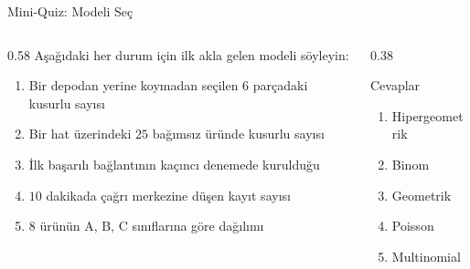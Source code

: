 \documentclass[light]{lutbeamer}
\begin{document}
\begin{frame}{Mini-Quiz: Modeli Seç}
    \scriptsize
    \begin{columns}[T,onlytextwidth]
        \begin{column}{0.58\textwidth}
            Aşağıdaki her durum için ilk akla gelen modeli söyleyin:
            \begin{enumerate}
                \item Bir depodan yerine koymadan seçilen \(6\) parçadaki kusurlu sayısı
                \item Bir hat üzerindeki \(25\) bağımsız üründe kusurlu sayısı
                \item İlk başarılı bağlantının kaçıncı denemede kurulduğu
                \item \(10\) dakikada çağrı merkezine düşen kayıt sayısı
                \item \(8\) ürünün A, B, C sınıflarına göre dağılımı
            \end{enumerate}
        \end{column}
        \begin{column}{0.38\textwidth}
            \begin{block}{Cevaplar}
                \begin{enumerate}
                    \item Hipergeometrik
                    \item Binom
                    \item Geometrik
                    \item Poisson
                    \item Multinomial
                \end{enumerate}
            \end{block}
        \end{column}
    \end{columns}
\end{frame}
\end{document}

